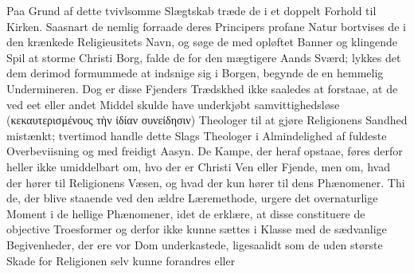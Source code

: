 \documentclass[12pt]{book}
\newcommand{\opage}[1]{\marginnote{\footnotesize\textit{[#1]}}}
\begin{document}
Paa Grund af dette tvivlsomme Slægtskab træde de i et doppelt Forhold til
Kirken. Saasnart de nemlig forraade deres Principers profane Natur bortvises de
i den krænkede Religieusitets Navn, og søge de med opløftet Banner og klingende
Spil at storme Christi Borg, falde de for den mægtigere
\opage{89} %
\setcounter{footnote}{0}%
Aands Sværd; lykkes det dem derimod formummede at indsnige sig i Borgen,
begynde de en hemmelig Undermineren. Dog er disse Fjenders Trædskhed ikke
saaledes at forstaae, at de ved eet eller andet Middel skulde have underkjøbt
samvittighedsløse (κεκαυτερισμένους τὴν ἰδίαν συνείδησιν) Theologer til at
gjøre Religionens Sandhed mistænkt; tvertimod handle dette Slags Theologer i
Almindelighed af fuldeste Overbeviisning og med freidigt Aasyn. De Kampe, der
heraf opstaae, føres derfor heller ikke umiddelbart om, hvo der er Christi Ven
eller Fjende, men om, hvad der hører til Religionens Væsen, og hvad der kun
hører til dens Phænomener. Thi de, der blive staaende ved den ældre
Læremethode, urgere det overnaturlige Moment i de hellige Phænomener, idet de
erklære, at disse constituere de objective Troesformer og derfor ikke kunne
sættes i Klasse med de sædvanlige Begivenheder, der ere vor Dom underkastede,
ligesaalidt som de uden største Skade for Religionen selv kunne forandres eller
\end{document}
